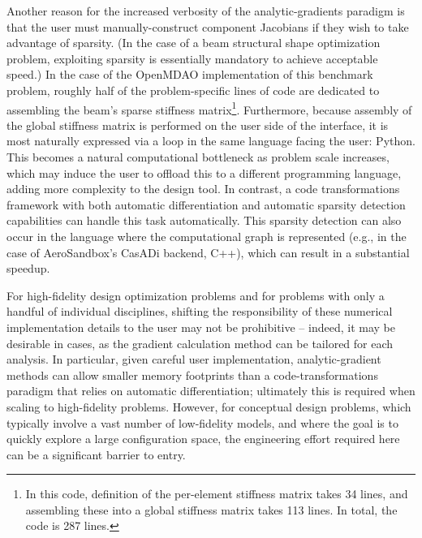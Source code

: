 Another reason for the increased verbosity of the analytic-gradients paradigm is that the user must manually-construct component Jacobians if they wish to take advantage of sparsity. (In the case of a beam structural shape optimization problem, exploiting sparsity is essentially mandatory to achieve acceptable speed.) In the case of the OpenMDAO implementation of this benchmark problem, roughly half of the problem-specific lines of code are dedicated to assembling the beam's sparse stiffness matrix\footnote{In this code, definition of the per-element stiffness matrix takes 34 lines, and assembling these into a global stiffness matrix takes 113 lines. In total, the code is 287 lines.}. Furthermore, because assembly of the global stiffness matrix is performed on the user side of the interface, it is most naturally expressed via a loop in the same language facing the user: Python. This becomes a natural computational bottleneck as problem scale increases, which may induce the user to offload this to a different programming language, adding more complexity to the design tool. In contrast, a code transformations framework with both automatic differentiation and automatic sparsity detection capabilities can handle this task automatically. This sparsity detection can also occur in the language where the computational graph is represented (e.g., in the case of AeroSandbox's CasADi backend, C++), which can result in a substantial speedup.

For high-fidelity design optimization problems and for problems with only a handful of individual disciplines, shifting the responsibility of these numerical implementation details to the user may not be prohibitive -- indeed, it may be desirable in cases, as the gradient calculation method can be tailored for each analysis. In particular, given careful user implementation, analytic-gradient methods can allow smaller memory footprints than a code-transformations paradigm that relies on automatic differentiation; ultimately this is required when scaling to high-fidelity problems. However, for conceptual design problems, which typically involve a vast number of low-fidelity models, and where the goal is to quickly explore a large configuration space, the engineering effort required here can be a significant barrier to entry.

